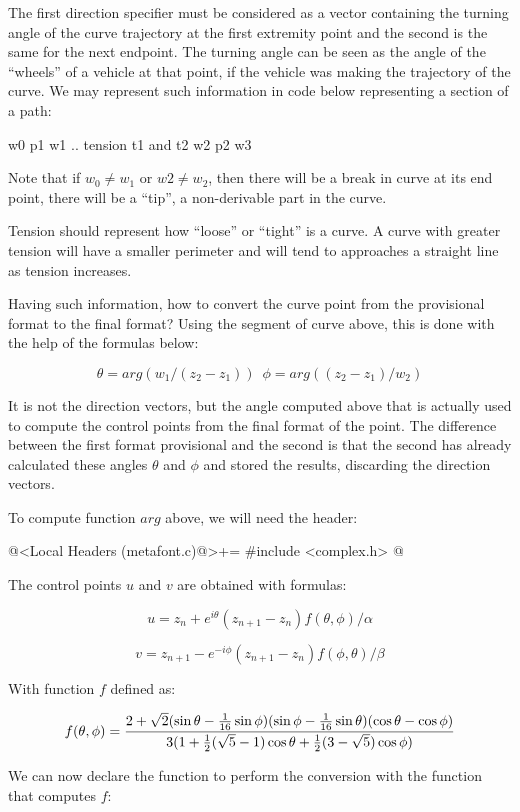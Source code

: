 The first direction specifier must be considered as a vector
containing the turning angle of the curve trajectory at the first
extremity point and the second is the same for the next endpoint. The
turning angle can be seen as the angle of the ``wheels'' of a vehicle
at that point, if the vehicle was making the trajectory of the
curve. We may represent such information in code below representing a
section of a path:

\alinhaverbatim
{w0} p1 {w1} .. tension t1 and t2 {w2} p2 {w3} 
\alinhanormal

Note that if $w_0\neq w_1$ or $w2 \neq w_2$, then there will be a
break in curve at its end point, there will be a ``tip'', a
non-derivable part in the curve.

Tension should represent how ``loose'' or ``tight'' is a curve. A
curve with greater tension will have a smaller perimeter and will tend
to approaches a straight line as tension increases.

Having such information, how to convert the curve point from the
provisional format to the final format? Using the segment of curve
above, this is done with the help of the formulas below:

$$
\theta = arg(w_1/(z_2-z_1))\,\,\,\phi = arg((z_2-z_1)/w_2)
$$

It is not the direction vectors, but the angle computed above that is
actually used to compute the control points from the final format of
the point. The difference between the first format provisional and the
second is that the second has already calculated these angles $\theta$
and $\phi$ and stored the results, discarding the direction vectors.

To compute function $arg$ above, we will need the header:

\iniciocodigo
@<Local Headers (metafont.c)@>+=
#include <complex.h>
@
\fimcodigo

The control points $u$ and $v$ are obtained with formulas:

$$
u = z_{n} + e^{i\theta}(z_{n+1}-z_n)f(\theta, \phi)/\alpha
$$

$$
v = z_{n+1} - e^{-i\phi}(z_{n+1}-z_n)f(\phi, \theta)/\beta
$$

With function $f$ defined as:

$$
f(\theta, \phi) = {{2+\sqrt{2}(\sin\theta-{{1}\over{16}}\sin\phi)(\sin\phi-{{1}\over{16}}\sin\theta)(\cos\theta-\cos\phi)}\over{3(1+{1\over 2}(\sqrt 5 - 1)\cos\theta+{1\over 2}(3-\sqrt 5)\cos\phi)}}
$$

We can now declare the function to perform the conversion with the
function that computes $f$:


